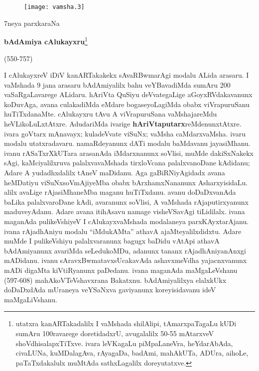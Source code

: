 \documentclass[11pt,a4size]{article}
\begin{document}
\begin{figure}[H]
\centering
\texttt{[image: vamsha.3]} 
\end{figure}

\eject

\begin{center}
{\Huge 7neya parxkaraNa}

\smallskip
\textbf{\LARGE bAdAmiya cAlukayxru}\footnote[1]{utatxra
  kanARTakadalilx I vaMshada shilAlipi, tAmarxpaTagaLu kUDi sumAru
  100ravarege doretidadxrU, avugalalilx 50-55 mAtarxveV
  shoVdhisalapxTiTxve. ivara leVKagaLu piMpaLaneVra, heYdarAbAda,
  civaLUNa, kuMDalagAva, rAyagaDa, badAmi, mahAkUTa, ADUra, aihoLe,
  paTaTxdakalulx muMtAda sathxLagalilx doreyutatxve.}

{\Large (550-757)}
\end{center}

I cAlukayxreV iDiV kanARTakakekx sAvaRBwmarAgi modalu ALida arasaru. I
vaMshada 9 jana arasaru bAdAmiyalilx bahu veYBavadiMda sumAru 200
vaSaRgaLavarege ALidaru. hAriVta QuSiyu deVvategaLige
aGoyxRVdakavanunx koDuvAga, avana culakadiMda eMdare bogaseyoLagiMda
obabx viVrapuruSanu huTiTxdanaMte. cAlukayxru tAvu A viVrapuruSana
vaMshajareMdu heVLikoLuLxtAtxre. AdudariMda ivarige
\textbf{hAriVtaputarx}reMdenunxtAtxre. ivara goVtarx mAnavayx;
kuladeVvate viSuNx; vaMsha caMdarxvaMsha. ivaru modalu
utatxradavaru. namaRdeyanunx dATi modalu baMdavanu jayasiMhanu. ivanu
rASaTxrXkUTara arasanAda iMdarxnanunx soVlisi, muMde dakiSxNakekx
sAgi, kaMciyalilxruva palalxvavaMshada tirxloVcana palalxvanoDane
kAdidanu; Adare A yudadhxdalilx tAneV maDidanu. Aga gaBiRNiyAgidadx
avana heMDatiyu viSuNxsoVmAjiyeMba obabx bArxhamxNananunx
AsharxyisidaLu. alilx avaLige rAjasiMhaneMba maganu huTiTxdanu. avanu
doDaDxvanAda baLika palalxvaroDane kAdi, avaranunx soVlisi, A vaMshada
rAjaputirxyanunx maduveyAdanu. Adare avana itihAsavu namage
visheVSavAgi tiLidilalx. ivana maganAda pulikeVshiyeV I
cAlukayxvaMshada modalaneya parxKAyxtarAjanu. ivana rAjadhAniyu modalu
``iMdukAMta'' athavA ajaMteyalilxdidxtu. Adare muMde I pulikeVshiyu
palalxvaranunx bagugx baDidu vAtApi athavA bAdAmiyanunx avariMda
seLedukoMDu, adanunx tananx rAjadhAniyanAnxgi mADidanu. ivanu
sAravxBwmatavxsUcakavAda ashavxmeVdha yajacnxvanunx mADi digaMta
kiVtiRyanunx paDedanu. ivana maganAda maMgaLeVshanu (597-608)
mahAkoVTeVshavxrana Bakatxnu. bAdAmiyalilxya elalxkUkx doDaDxdAda
mUraneya veYSaNxva gaviyanunx koreyisidavanu ideV maMgaLiVshanu.
\end{document}
